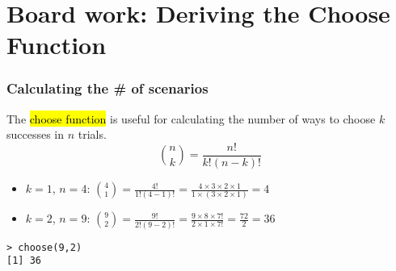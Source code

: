 \documentclass[slidestop,compress,mathserif]{beamer}
\begin{document}

\section{Board work: Deriving the Choose Function}


\begin{frame}[fragile]
\frametitle{Calculating the \# of scenarios}

{
The \hl{choose function} is useful for calculating the number of ways to choose $k$ successes in $n$ trials.
\[ {n \choose k} = \frac{n!}{k! (n - k)!} \]
}

\pause

\begin{itemize}

\item $k = 1$, $n = 4$: ${4 \choose 1} = \frac{4!}{1! (4 - 1)!} = \frac{4 \times 3 \times 2 \times 1}{1 \times (3 \times 2 \times 1)} = 4$

\pause

\item $k = 2$, $n = 9$: ${9 \choose 2} = \frac{9!}{2! (9 - 2)!} = \frac{9 \times 8 \times 7!}{2 \times 1 \times 7!} = \frac{72}{2} = 36$

\end{itemize}

\vfill

\begin{beamerboxesrounded}[shadow = true, lower = code body]{}
{\small
\begin{verbatim}
> choose(9,2)
[1] 36
\end{verbatim}
}
\end{beamerboxesrounded}

\end{frame}




\end{document}
